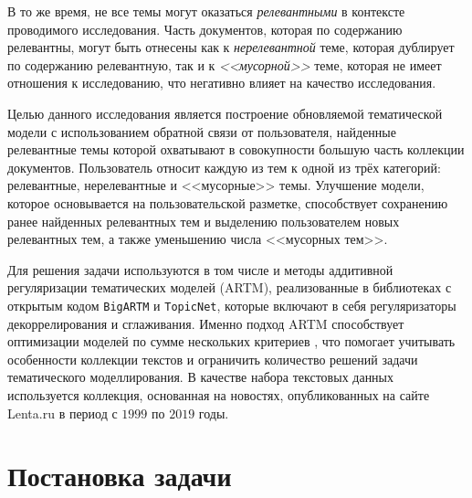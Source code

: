 \documentclass{article}
\begin{document}
В то же время, не все темы могут оказаться \textit{релевантными} в контексте проводимого исследования.
Часть документов, которая по содержанию релевантны, могут быть отнесены как к \textit{нерелевантной} теме, которая дублирует по содержанию релевантную, так и к \textit{<<мусорной>>} теме, которая не имеет отношения к исследованию, что негативно влияет на качество исследования.

Целью данного исследования является построение обновляемой тематической модели с использованием обратной связи от пользователя, найденные релевантные темы которой охватывают в совокупности большую часть коллекции документов.
Пользователь относит каждую из тем к одной из трёх категорий: релевантные, нерелевантные и <<мусорные>> темы. Улучшение модели, которое основывается на пользовательской разметке, способствует сохранению ранее найденных релевантных тем и выделению пользователем новых релевантных тем, а также уменьшению числа <<мусорных тем>>.


Для решения задачи используются в том числе и методы аддитивной регуляризации тематических моделей (ARTM), реализованные в библиотеках с открытым кодом \texttt{BigARTM} и \texttt{TopicNet}, которые включают в себя регуляризаторы декоррелирования и сглаживания. Именно подход ARTM способствует оптимизации моделей по сумме нескольких критериев \citep{artm}, что помогает учитывать особенности коллекции текстов и ограничить количество решений задачи тематического моделлирования. В качестве набора текстовых данных используется коллекция, основанная на новостях, опубликованных на сайте Lenta.ru в период с $1999$ по $2019$ годы.

\section{Постановка задачи}

\end{document}
